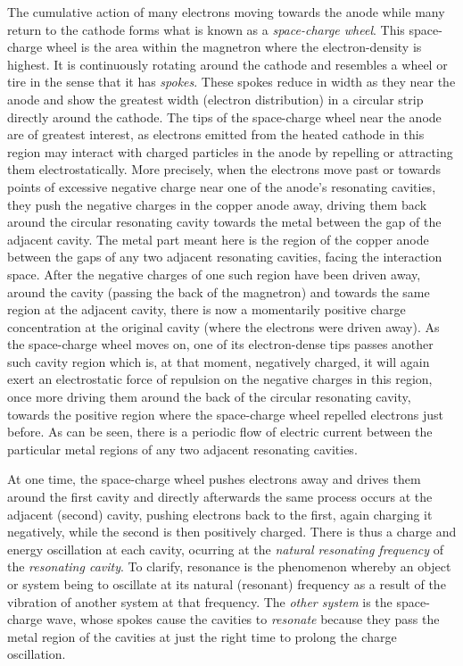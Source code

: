 The cumulative action of many electrons moving towards the anode while many return to the cathode forms what is known as a \emph{space-charge wheel}. This space-charge wheel is the area within the magnetron where the electron-density is highest. It is continuously rotating around the cathode and resembles a wheel or tire in the sense that it has \emph{spokes}. These spokes reduce in width as they near the anode and show the greatest width (electron distribution) in a circular strip directly around the cathode. The tips of the space-charge wheel near the anode are of greatest interest, as electrons emitted from the heated cathode in this region may interact with charged particles in the anode by repelling or attracting them electrostatically. More precisely, when the electrons move past or towards points of excessive negative charge near one of the anode's resonating cavities, they push the negative charges in the copper anode away, driving them back around the circular resonating cavity towards the metal between the gap of the adjacent cavity. The metal part meant here is the region of the copper anode between the gaps of any two adjacent resonating cavities, facing the interaction space. After the negative charges of one such region have been driven away, around the cavity (passing the back of the magnetron) and towards the same region at the adjacent cavity, there is now a momentarily positive charge concentration at the original cavity (where the electrons were driven away). As the space-charge wheel moves on, one of its electron-dense tips passes another such cavity region which is, at that moment, negatively charged, it will again exert an electrostatic force of repulsion on the negative charges in this region, once more driving them around the back of the circular resonating cavity, towards the positive region where the space-charge wheel repelled electrons just before. As can be seen, there is a periodic flow of electric current between the particular metal regions of any two adjacent resonating cavities. 

At one time, the space-charge wheel pushes electrons away and drives them around the first cavity and directly afterwards the same process occurs at the adjacent (second) cavity, pushing electrons back to the first, again charging it negatively, while the second is then positively charged. There is thus a charge and energy oscillation at each cavity, ocurring at the \emph{natural resonating frequency} of the \emph{resonating cavity}. To clarify, resonance is the phenomenon whereby an object or system being to oscillate at its natural (resonant) frequency as a result of the vibration of another system at that frequency. The \emph{other system} is the space-charge wave, whose spokes cause the cavities to \emph{resonate} because they pass the metal region of the cavities at just the right time to prolong the charge oscillation.

